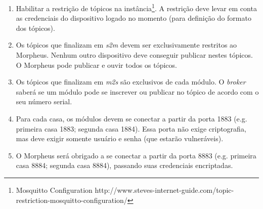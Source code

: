 \begin{enumerate}
\item Habilitar a restrição de tópicos na instância\footnote{Mosquitto Configuration http://www.steves-internet-guide.com/topic-restriction-mosquitto-configuration/}. A restrição deve levar em conta as credenciais do dispositivo logado no momento (para definição do formato dos tópicos).

\item Os tópicos que finalizam em \emph{s2m} devem ser exclusivamente restritos ao Morpheus. Nenhum outro dispositivo deve conseguir publicar nestes tópicos. O Morpheus pode publicar e ouvir todos os tópicos.

\item Os tópicos que finalizam em \emph{m2s} são exclusivos de cada módulo. O \emph{broker} saberá se um módulo pode se inscrever ou publicar no tópico de acordo com o seu número serial.

\item Para cada casa, os módulos devem se conectar a partir da porta 1883 (e.g. primeira casa \textrightarrow{} 1883; segunda casa \textrightarrow{} 1884). Essa porta não exige criptografia, mas deve exigir somente usuário e senha (que estarão vulneráveis).

\item O Morpheus será obrigado a se conectar a partir da porta 8883 (e.g. primeira casa \textrightarrow{} 8884; segunda casa \textrightarrow{} 8884), passando suas credenciais encriptadas.
\end{enumerate}

